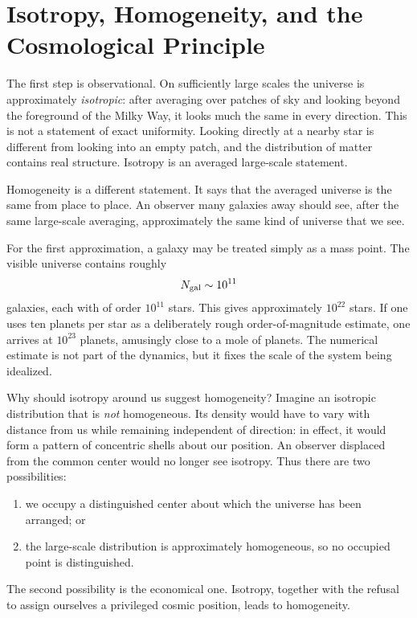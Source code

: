 \section{Isotropy, Homogeneity, and the Cosmological Principle}

The first step is observational. On sufficiently large scales the universe is approximately \emph{isotropic}: after averaging over patches of sky and looking beyond the foreground of the Milky Way, it looks much the same in every direction. This is not a statement of exact uniformity. Looking directly at a nearby star is different from looking into an empty patch, and the distribution of matter contains real structure. Isotropy is an averaged large-scale statement.

Homogeneity is a different statement. It says that the averaged universe is the same from place to place. An observer many galaxies away should see, after the same large-scale averaging, approximately the same kind of universe that we see.

For the first approximation, a galaxy may be treated simply as a mass point. The visible universe contains roughly
\begin{equation}
N_{\rm gal}\sim 10^{11}
\end{equation}
galaxies, each with of order \(10^{11}\) stars. This gives approximately \(10^{22}\) stars. If one uses ten planets per star as a deliberately rough order-of-magnitude estimate, one arrives at \(10^{23}\) planets, amusingly close to a mole of planets. The numerical estimate is not part of the dynamics, but it fixes the scale of the system being idealized.

\begin{classroomqa}
\end{classroomqa}

Why should isotropy around us suggest homogeneity? Imagine an isotropic distribution that is \emph{not} homogeneous. Its density would have to vary with distance from us while remaining independent of direction: in effect, it would form a pattern of concentric shells about our position. An observer displaced from the common center would no longer see isotropy. Thus there are two possibilities:
\begin{enumerate}
\item we occupy a distinguished center about which the universe has been arranged; or
\item the large-scale distribution is approximately homogeneous, so no occupied point is distinguished.
\end{enumerate}
The second possibility is the economical one. Isotropy, together with the refusal to assign ourselves a privileged cosmic position, leads to homogeneity.

